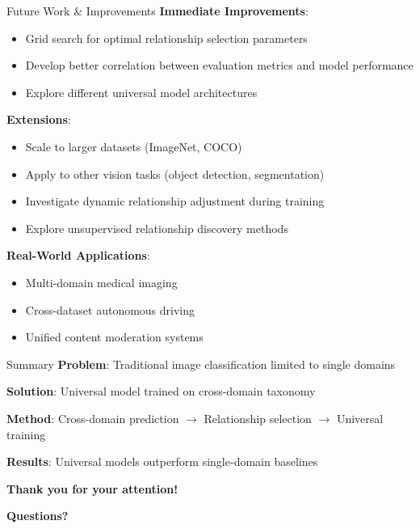 \documentclass[aspectratio=169]{beamer}
\begin{document}
\begin{frame}{Future Work \& Improvements}
    \textbf{Immediate Improvements}:
    \begin{itemize}
        \item Grid search for optimal relationship selection parameters
        \item Develop better correlation between evaluation metrics and model performance
        \item Explore different universal model architectures
    \end{itemize}

    \vspace{1em}

    \textbf{Extensions}:
    \begin{itemize}
        \item Scale to larger datasets (ImageNet, COCO)
        \item Apply to other vision tasks (object detection, segmentation)
        \item Investigate dynamic relationship adjustment during training
        \item Explore unsupervised relationship discovery methods
    \end{itemize}

    \vspace{1em}

    \textbf{Real-World Applications}:
    \begin{itemize}
        \item Multi-domain medical imaging
        \item Cross-dataset autonomous driving
        \item Unified content moderation systems
    \end{itemize}
\end{frame}

\begin{frame}{Summary}
    \textbf{Problem}: Traditional image classification limited to single domains

    \textbf{Solution}: Universal model trained on cross-domain taxonomy

    \textbf{Method}: Cross-domain prediction $\rightarrow$ Relationship selection $\rightarrow$ Universal training

    \textbf{Results}: Universal models outperform single-domain baselines

    \vspace{2em}

    \begin{center}
        \textbf{\Large Thank you for your attention!}

        \vspace{1em}

        \textbf{Questions?}
    \end{center}
\end{frame}
\end{document}
